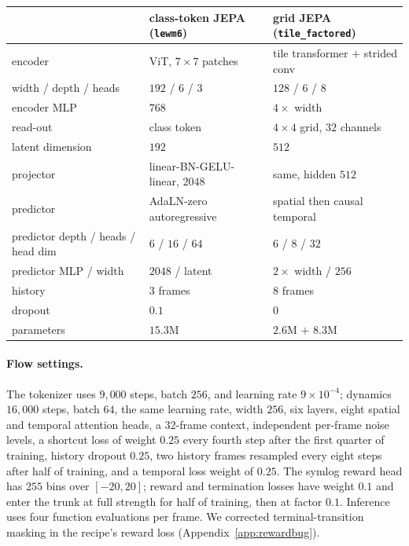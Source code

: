 \begin{center}
{\small
\begin{tabular}{lll}
\toprule
& class-token JEPA (\texttt{lewm6}) & grid JEPA (\texttt{tile\_factored}) \\
\midrule
encoder            & ViT, $7\times7$ patches           & tile transformer $+$ strided conv \\
width / depth / heads & $192$ / $6$ / $3$              & $128$ / $6$ / $8$ \\
encoder MLP        & $768$                              & $4\times$ width \\
read-out           & class token                        & $4\times4$ grid, $32$ channels \\
latent dimension   & $192$                              & $512$ \\
projector          & linear-BN-GELU-linear, $2048$      & same, hidden $512$ \\
predictor          & AdaLN-zero autoregressive          & spatial then causal temporal \\
predictor depth / heads / head dim & $6$ / $16$ / $64$  & $6$ / $8$ / $32$ \\
predictor MLP / width & $2048$ / latent                 & $2\times$ width / $256$ \\
history            & $3$ frames                         & $8$ frames \\
dropout            & $0.1$                              & $0$ \\
parameters         & $15.3$M                            & $2.6$M $+$ $8.3$M \\
\bottomrule
\end{tabular}}
\end{center}

\paragraph{Flow settings.}
The tokenizer uses $9{,}000$ steps, batch $256$, and learning rate $9\times10^{-4}$; dynamics
$16{,}000$ steps, batch $64$, the same learning rate, width $256$, six layers, eight spatial and
temporal attention heads, a $32$-frame context, independent per-frame noise levels, a shortcut loss of
weight $0.25$ every fourth step after the first quarter of training, history dropout $0.25$, two
history frames resampled every eight steps after half of training, and a temporal loss weight of
$0.25$. The symlog reward head has $255$ bins over $[-20,20]$; reward and termination losses have
weight $0.1$ and enter the trunk at full strength for half of training, then at factor $0.1$.
Inference uses four function evaluations per frame. We corrected terminal-transition masking in the
recipe's reward loss (Appendix~\ref{app:rewardbug}).

